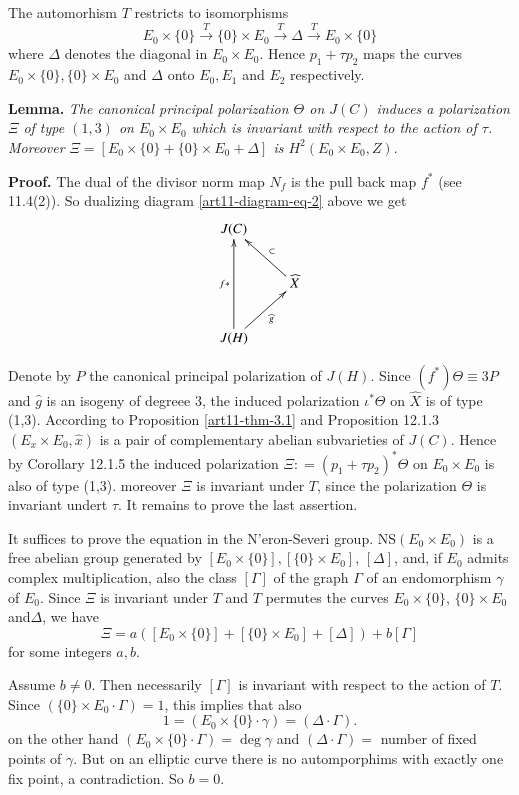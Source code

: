 The automorhism $T$ restricts to isomorphisms
$$
E_{0} \times \{0\} \xrightarrow{T}\{0\} \times E_{0} \xrightarrow{T}\Delta\xrightarrow{T} E_{0} \times \{0\}
$$ 
where $\Delta$ denotes the diagonal in $E_{0}\times E_{0}$. Hence $p_{1} + \tau p_{2}$ maps the curves $E_{0}\times \{0\}, \{0\} \times E_{0}$ and $\Delta$ onto $E_{0}, E_{1}$ and $E_{2}$ respectively.

\medskip
\noindent
{\bfseries {} Lemma.\label{art11-lemma-5.4}} \textit{The canonical principal polarization $\Theta$ on $J(C)$ induces a polarization $\Xi$ of type $(1,3)$ on $E_{0} \times E_{0}$ which is invariant with respect to the action of $\tau$.
 Moreover $\Xi =[E_{0}\times \{0\} + \{0\} \times E_{0}+ \Delta]$ is $H^{2}(E_{0}\times E_{0}, Z)$}.

 \medskip
\noindent
{\bfseries Proof.} The dual of the divisor norm map $N_{f}$ is the pull back map $f^{*}$
(see \cite{art11-keyL-B} 11.4(2)). So dualizing diagram \eqref{art11-diagram-eq-2} above we get
$$
\xymatrix{
J(C) & \\
    &\widehat{X} \ar[ul]_-{\subset}\\
J(H) \ar[ur]_-{\widehat{g}}\ar[uu]^-{f*} &     
}
$$

Denote by $P$ the canonical principal polarization of $J(H)$. Since $(f^{*}) \Theta \equiv 3P$ and $\widehat{g}$ is an isogeny of degreee 3, the induced polarization $\iota^{*}\Theta$ on $\widehat{X}$ is of type (1,3). According to Proposition \ref{art11-thm-3.1} and \cite{art11-keyL-B} Proposition 12.1.3 $(E_{x} \times E_{0}, \widehat{x})$ is a pair of complementary abelian subvarieties of $J(C)$. Hence by \cite{art11-keyL-B} Corollary 12.1.5 the induced polarization
$\Xi : = (p_{1} + \tau p_{2})^{*}\Theta$ on $E_{0} \times E_{0}$ is also of type (1,3). moreover $\Xi$ is invariant under $T$, since the polarization $\Theta$ is invariant undert $\tau$. It remains to prove the last assertion.

It suffices to prove the equation in the N'eron-Severi group. NS$(E_{0}\times E_{0})$ is a free abelian group generated by $[E_{0} \times \{0\}],[\{0\} \times E_{0}]$, $[\Delta]$, and, if $E_{0}$ admits complex multiplication, also the class $[\Gamma]$  of the graph $\Gamma$ of an endomorphism $\gamma$ of $E_{0}$. Since $\Xi$ is invariant under $T$ and $T$ permutes the curves $E_{0} \times \{0\}$, $\{0\}\times E_{0}$ and$ \Delta$, we have
$$
\Xi = a([E_{0} \times \{0\}] + [\{0\} \times E_{0}] + [\Delta]) +b[\Gamma]
$$
for some integers $a,b$.

Assume $b\neq 0$. Then necessarily $[\Gamma]$ is invariant with respect to the action of $T$. Since $(\{0\} \times E_{0}\cdot \Gamma)=1$, this implies that also
$$
1 =(E_{0}\times \{0\}\cdot \gamma)=(\Delta \cdot \Gamma).
$$
on the other hand $(E_{0} \times \{0\}\cdot \Gamma)=\deg \gamma$ and  $(\Delta \cdot \Gamma)=$ number of fixed points of $\gamma$. But on an elliptic curve there is no automporphims with exactly one fix point, a contradiction. So $b=0$.

